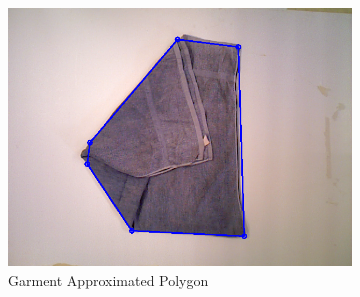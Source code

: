 \begin{figure}[htbp]
\begin{subfigure}[r]{0.49\textwidth}
    	\includegraphics[width=\textwidth]
    	{figures/polygon-approx-01.png}
    	\caption{Garment Approximated Polygon}
	\end{subfigure} 
    \caption{}
    \label{fig:contour_and_simplified_contour}
\end{figure}
